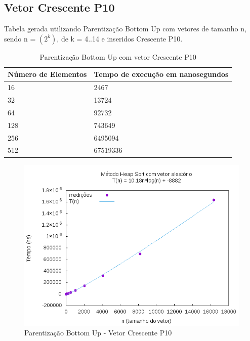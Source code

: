 \documentclass[12pt,a4paper,twoside]{report}
\begin{document}
\subsection{Vetor Crescente P10}
Tabela gerada utilizando Parentização Bottom Up com vetores de tamanho n, sendo n = $(2^k)$, de k = 4..14 e inseridos Crescente P10.
\begin{table}[H]
\centering
\caption{Parentização Bottom Up com vetor Crescente P10}
\label{my-label}
\begin{tabular}{|l|l|}
\hline
\multicolumn{1}{|c|}{\textbf{Número de Elementos}} & \multicolumn{1}{c|}{\textbf{Tempo de execução em nanosegundos}} \\ \hline
16 & 2467 \\ \hline
32 & 13724 \\ \hline
64 & 92732 \\ \hline
128 & 743649 \\ \hline
256 & 6495094 \\ \hline
512 & 67519336 \\ \hline
\end{tabular}
\end{table}

\begin{figure}[H]
    \centering
    \includegraphics[width=0.7\linewidth]{graficos/HeapSort/vIntAleatorio/vIntAleatorio.png}
  \caption{Parentização Bottom Up - Vetor Crescente P10}
\end{figure}
\end{document}
